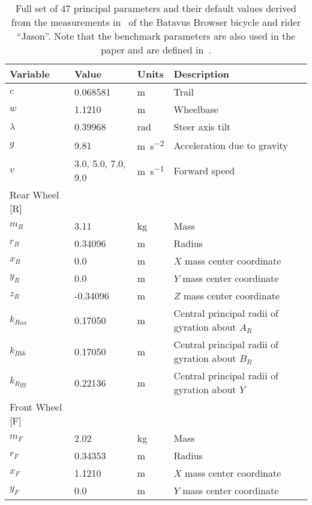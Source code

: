 \documentclass{bmd2019p}
\begin{document}
\begin{table}
  \caption{Full set of 47 principal parameters and their default values derived
    from the measurements in~\cite{Moore2012} of the Batavus Browser bicycle
    and rider ``Jason''. Note that the benchmark parameters are also used in
    the paper and are defined in~\cite{Meijaard2007}.}
  \label{tab:parameters}
  \small
  \centering
  \begin{tabular}{llll}
    \toprule
    Variable & Value & Units & Description \\
    \midrule
    $c$       &  0.068581           & \si{\meter} & Trail \\
    $w$       &  1.1210             & \si{\meter} & Wheelbase \\
    $\lambda$ & 0.39968             & \si{\radian} & Steer axis tilt \\
    $g$       &  9.81               & \si{\meter\per\second\squared} & Acceleration due to gravity \\
    $v$       &  3.0, 5.0, 7.0, 9.0 & \si{\meter\per\second} & Forward speed \\
    Rear Wheel [R] & & \\
    \midrule
    $m_R$     & 3.11 & \si{\kilogram}  & Mass \\
    $r_R$     & 0.34096 & \si{\meter}  & Radius \\
    $x_R$     & 0.0 & \si{\meter}      & $X$ mass center coordinate \\
    $y_R$     & 0.0 & \si{\meter}      & $Y$ mass center coordinate \\
    $z_R$     & -0.34096 & \si{\meter} & $Z$ mass center coordinate \\
    $k_{Raa}$ & 0.17050 & \si{\meter}  & Central principal radii of gyration about $A_R$ \\
    $k_{Rbb}$ & 0.17050 & \si{\meter}  & Central principal radii of gyration about $B_R$ \\
    $k_{Ryy}$ & 0.22136 & \si{\meter}  & Central principal radii of gyration about $Y$ \\
    Front Wheel [F] & & \\
    \midrule
    $m_F$     & 2.02 & \si{\kilogram} & Mass \\
    $r_F$     & 0.34353 & \si{\meter} & Radius \\
    $x_F$     & 1.1210 & \si{\meter} & $X$ mass center coordinate \\
    $y_F$     & 0.0 & \si{\meter} & $Y$ mass center coordinate \\

\end{tabular}
\end{table}
\end{document}
